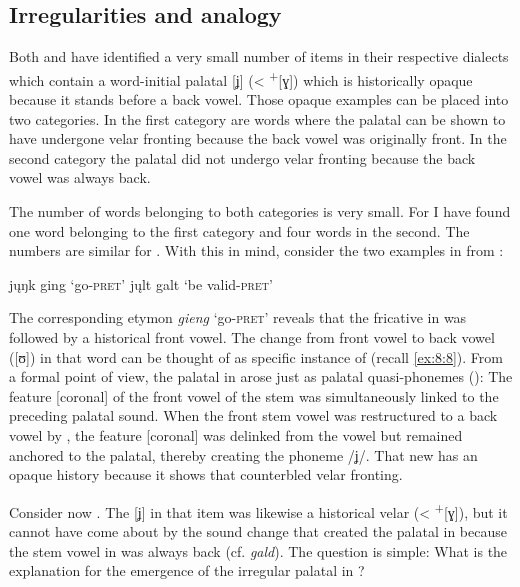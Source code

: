 \subsection{Irregularities and analogy}\label{sec:8.6.2}

Both \citet{Block1910} and  \citet{Hille1939} have identified a very small number of items in their respective dialects which contain a word-initial palatal [ʝ] (< \textsuperscript{+}[ɣ]) which is historically opaque because it stands before a back vowel. Those opaque examples can be placed into two categories. In the first category are words where the palatal can be shown to have undergone velar fronting because the back vowel was originally front. In the second category the palatal did not undergo velar fronting because the back vowel was always back.

The number of words belonging to both categories is very small. For  I have found one word belonging to the first category and four words in the second. The numbers are similar for . With this in mind, consider the two examples in  from  \citep{Block1910}:

\ea\label{ex:8:38}
\ea\label{ex:8:38a}  j\k{u}ŋk \tab [ʝʊŋk] \tab ging \tab ‘go\textsc{{}-pret}’      
\ex\label{ex:8:38b}  j\k{u}lt \tab [ʝʊlt] \tab galt \tab ‘be valid\textsc{{}-pret}’ 
\z 
\z 

The corresponding  etymon \textit{gieng} ‘go\textsc{{}-pret}’ reveals that the fricative in  was followed by a historical front vowel. The change from front vowel to back vowel ([ʊ]) in that word can be thought of as specific instance of  (recall \ref{ex:8:8}). From a formal point of view, the palatal in  arose just as palatal quasi-phonemes (): The feature [coronal] of the front vowel of the stem was simultaneously linked to the preceding palatal sound. When the front stem vowel was restructured to a back vowel by , the feature [coronal] was delinked from the vowel but remained anchored to the palatal, thereby creating the phoneme /ʝ/. That new  has an opaque history because it shows that  counterbled velar fronting.

Consider now . The [ʝ] in that item was likewise a historical velar (<  \textsuperscript{+}[ɣ]), but it cannot have come about by the sound change that created the palatal in  because the stem vowel in  was always back (cf.  \textit{gald}). The question is simple: What is the explanation for the emergence of the irregular palatal in ?

